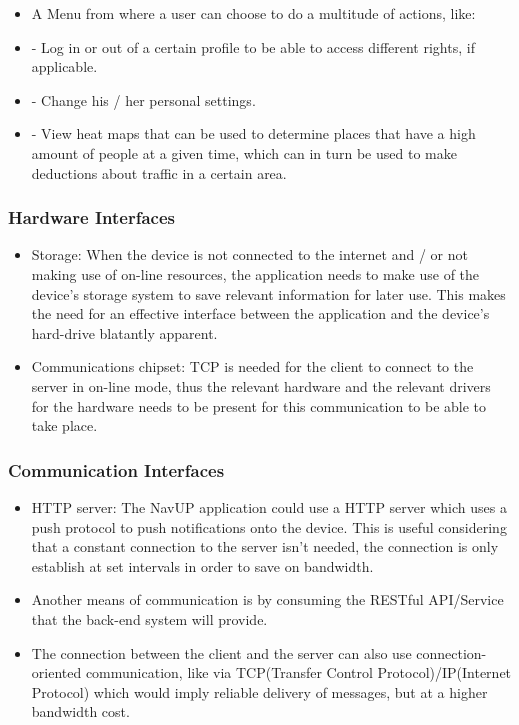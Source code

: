 \documentclass[runningheads,a4paper]{article}
\begin{document}
\begin{itemize}
	\item A Menu from where a user can choose to do a multitude of actions, like:
	    
	 \item - Log in or out of a certain profile to be able to access different rights, if applicable.
	
	 \item - Change his / her personal settings.
	
	 \item - View heat maps that can be used to determine places that have a high amount of people at a given time, which can in turn be used to make deductions about traffic in a certain area.
	
\end{itemize}

\subsubsection{Hardware Interfaces}
\begin{itemize}
	
	\item Storage: When the device is not connected to the internet and / or not making use of on-line resources, the application needs to make use of the device's storage system to save relevant information for later use. This makes the need for an effective interface between the application and the device's hard-drive blatantly apparent.
	
	\item Communications chipset: TCP is needed for the client to connect to the server in on-line mode, thus the relevant hardware and the relevant drivers for the hardware needs to be present for this communication to be able to take place.
	
\end{itemize}

\subsubsection{Communication Interfaces}
\begin{itemize}

	\item HTTP server: The NavUP application could use a HTTP server which uses a push protocol to push notifications onto the device. This is useful considering that a constant connection to the server isn't needed, the connection is only establish at set intervals in order to save on bandwidth.
	
	\item  Another means of communication is by consuming the RESTful API/Service that the back-end system will provide.
	
	\item The connection between the client and the server can also use connection-oriented communication, like via TCP(Transfer Control Protocol)/IP(Internet Protocol) which would imply reliable delivery of messages, but at a higher bandwidth cost.

\end{itemize}
\end{document}
